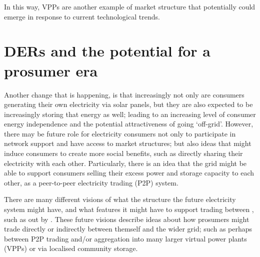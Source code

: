 
\DIFdelend In this way, VPPs are another example of market structure that potentially could emerge in response to current technological trends.
\DIFaddbegin {}

\DIFaddend 


\section{DERs and the potential for a prosumer era}\DIFaddbegin \label{sec:intro_part13}
\DIFaddend 

Another change that is happening, is that increasingly not only are consumers generating their own electricity via solar panels, but they are also expected to be increasingly storing that energy as well; leading to an increasing level of consumer energy independence and the potential attractiveness of going `off-grid'.
However, there may be future role for electricity consumers \DIFdelbegin {}\DIFdelend not only to participate in network support and have access to market structures; but also ideas that might induce consumers to create more social benefits, such as directly sharing their electricity with each other.
Particularly, there is an idea that the grid might be able to support consumers selling their excess power and storage capacity to each other, as a peer-to-peer electricity trading (P2P) system.

There are many different visions of what the structure the future electricity system might have, and what features it might have to support trading between \DIFdelbegin {}\DIFdelend \DIFaddbegin {}\DIFaddend , such as \DIFdelbegin {}\DIFdelend \DIFaddbegin {}\DIFaddend out by \cite{Parag2016}.
These future visions describe ideas about how prosumers might trade directly or indirectly between themself and the wider grid; such as perhaps between P2P trading and/or aggregation into many larger virtual power plants (VPPs) or via localised community storage\DIFdelbegin {}\DIFdelend \DIFaddbegin {}\DIFaddend .

